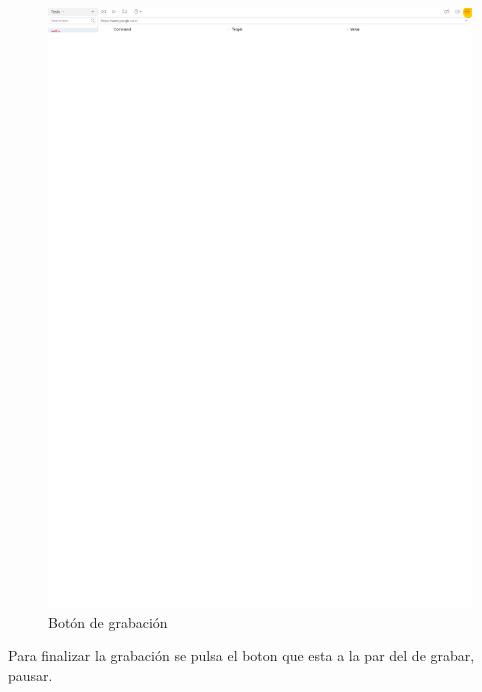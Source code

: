 \documentclass[conference]{IEEEtran}
\begin{document}
\begin{figure}[H]
\centering
\includegraphics[scale=0.47]{imagenes/19.1.pdf}
\caption{Botón de grabación}
\end{figure}

Para finalizar la grabación se pulsa el boton que esta  a la par del de grabar, pausar.
\end{document}
